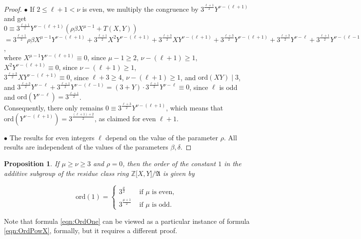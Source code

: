 \documentclass{amsart}
\newtheorem{proposition}{Proposition}[section]
\theoremstyle{definition}
\numberwithin{equation}{section}
\begin{document}
\begin{proof}
\(\bullet\)
If \(2\le\ell+1<\nu\) is even, we multiply the congruence by \(3^{\frac{\ell+1}{2}}Y^{\nu-(\ell+1)}\) and get\\
\(0\equiv 3^{\frac{\ell+1}{2}}Y^{\nu-(\ell+1)}\left(\rho\beta X^{\mu-1}+T(X,Y)\right)\)\\
\(=3^{\frac{\ell+1}{2}}\rho\beta X^{\mu-1}Y^{\nu-(\ell+1)}+3^{\frac{\ell+1}{2}}X^2Y^{\nu-(\ell+1)}+3^{\frac{\ell+3}{2}}XY^{\nu-(\ell+1)}
+3^{\frac{\ell+3}{2}}Y^{\nu-(\ell+1)}+3^{\frac{\ell+3}{2}}Y^{\nu-\ell}+3^{\frac{\ell+1}{2}}Y^{\nu-(\ell-1)}\),\\
where \(X^{\mu-1}Y^{\nu-(\ell+1)}\equiv 0\), since \(\mu-1\ge 2\), \(\nu-(\ell+1)\ge 1\),\\ 
\(X^2Y^{\nu-(\ell+1)}\equiv 0\), since \(\nu-(\ell+1)\ge 1\),\\
\(3^{\frac{\ell+3}{2}}XY^{\nu-(\ell+1)}\equiv 0\), since \(\ell+3\ge 4\), \(\nu-(\ell+1)\ge 1\), and \(\mathrm{ord}(XY)\mid 3\),\\
and \(3^{\frac{\ell+3}{2}}Y^{\nu-\ell}+3^{\frac{\ell+1}{2}}Y^{\nu-(\ell-1)}=(3+Y)\cdot 3^{\frac{\ell+1}{2}}Y^{\nu-\ell}\equiv 0\),
since \(\ell\) is odd and \(\mathrm{ord}(Y^{\nu-\ell})=3^{\frac{\ell+1}{2}}\).\\
Consequently, there only remains \(0\equiv 3^{\frac{\ell+3}{2}}Y^{\nu-(\ell+1)}\), which means that
\(\mathrm{ord}(Y^{\nu-(\ell+1)})=3^{\frac{(\ell+1)+2}{2}}\), as claimed for even \(\ell+1\).

\(\bullet\)
The results for even integers \(\ell\) depend on the value of the parameter \(\rho\).
All results are independent of the values of the parameters \(\beta,\delta\).
\end{proof}


\begin{proposition}
\label{prp:OrdOne}
If \(\mu\ge\nu\ge 3\) and \(\rho=0\), then the order of the constant \(1\)
in the additive subgroup of the residue class ring \(\mathbb{Z}\lbrack X,Y\rbrack/\mathfrak{A}\)
is given by

\begin{equation}
\label{eqn:OrdOne}
\mathrm{ord}(1)=
\begin{cases}
3^{\frac{\mu}{2}}   & \text{ if } \mu \text{ is even},\\
3^{\frac{\mu+1}{2}} & \text{ if } \mu \text{ is odd}.
\end{cases}
\end{equation}

\end{proposition}

\noindent
Note that formula
\eqref{eqn:OrdOne}
can be viewed as a particular instance of formula
\eqref{eqn:OrdPowX},
formally, but it requires a different proof.
\end{document}
